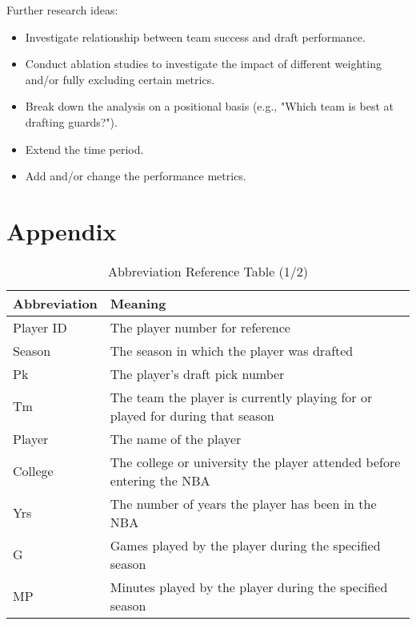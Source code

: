 \documentclass[12pt]{article}
\begin{document}
\vspace{5mm}
Further research ideas:

\begin{itemize}
    \item Investigate relationship between team success and draft performance.
    \item Conduct ablation studies to investigate the impact of different weighting and/or fully excluding certain metrics.
    \item Break down the analysis on a positional basis (e.g., "Which team is best at drafting guards?").
    \item Extend the time period.
    \item Add and/or change the performance metrics.
\end{itemize}


\newpage

\appendix
\section{Appendix}



\begin{table}[htbp]
    \centering
    \caption{Abbreviation Reference Table (1/2)}
    \label{table:3}
    \vspace{5mm}
    \begin{tabular}{|l|p{10cm}|}
    \hline
    \rowcolor{gray!25} \textbf{Abbreviation} & \textbf{Meaning} \\
    \hline
    Player ID & The player number for reference \\
    \hline
    Season & The season in which the player was drafted \\
    \hline
    Pk & The player's draft pick number \\
    \hline
    Tm & The team the player is currently playing for or played for during that season \\
    \hline
    Player & The name of the player \\
    \hline
    College & The college or university the player attended before entering the NBA \\
    \hline
    Yrs & The number of years the player has been in the NBA \\
    \hline
    G & Games played by the player during the specified season \\
    \hline
    MP & Minutes played by the player during the specified season \\
    \hline

    \hline
    \end{tabular}
    \end{table}
    
\end{document}
